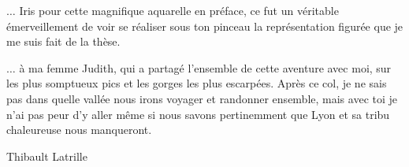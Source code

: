 $\hdots$ Iris pour cette magnifique aquarelle en préface, ce fut un véritable émerveillement de voir se réaliser sous ton pinceau la représentation figurée que je me suis fait de la thèse.

$\hdots$ à ma femme Judith, qui a partagé l’ensemble de cette aventure avec moi, sur les plus somptueux pics et les gorges les plus escarpées.
Après ce col, je ne sais pas dans quelle vallée nous irons voyager et randonner ensemble, mais avec toi je n’ai pas peur d’y aller même si nous savons pertinemment que Lyon et sa tribu chaleureuse nous manqueront.

\begin{flushright}
    Thibault Latrille
\end{flushright}
